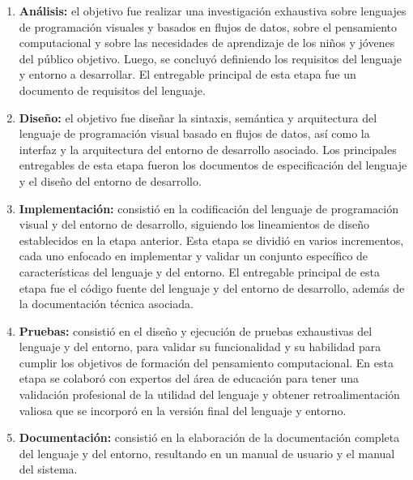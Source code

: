 \begin{enumerate}
    \item \textbf{Análisis:} el objetivo fue realizar una investigación exhaustiva sobre lenguajes de programación visuales y basados en flujos de datos, sobre el pensamiento computacional y sobre las necesidades de aprendizaje de los niños y jóvenes del público objetivo. Luego, se concluyó definiendo los requisitos del lenguaje y entorno a desarrollar. El entregable principal de esta etapa fue un documento de requisitos del lenguaje.
    \item \textbf{Diseño:} el objetivo fue diseñar la sintaxis, semántica y arquitectura del lenguaje de programación visual basado en flujos de datos, así como la interfaz y la arquitectura del entorno de desarrollo asociado. Los principales entregables de esta etapa fueron los documentos de especificación del lenguaje y el diseño del entorno de desarrollo.
    \item \textbf{Implementación:} consistió en la codificación del lenguaje de programación visual y del entorno de desarrollo, siguiendo los lineamientos de diseño establecidos en la etapa anterior. Esta etapa se dividió en varios incrementos, cada uno enfocado en implementar y validar un conjunto específico de características del lenguaje y del entorno. El entregable principal de esta etapa fue el código fuente del lenguaje y del entorno de desarrollo, además de la documentación técnica asociada.
    \item \textbf{Pruebas:} consistió en el diseño y ejecución de pruebas exhaustivas del lenguaje y del entorno, para validar su funcionalidad y su habilidad para cumplir los objetivos de formación del pensamiento computacional. En esta etapa se colaboró con expertos del área de educación para tener una validación profesional de la utilidad del lenguaje y obtener retroalimentación valiosa que se incorporó en la versión final del lenguaje y entorno.
    \item \textbf{Documentación:} consistió en la elaboración de la documentación completa del lenguaje y del entorno, resultando en un manual de usuario y el manual del sistema.
\end{enumerate}
